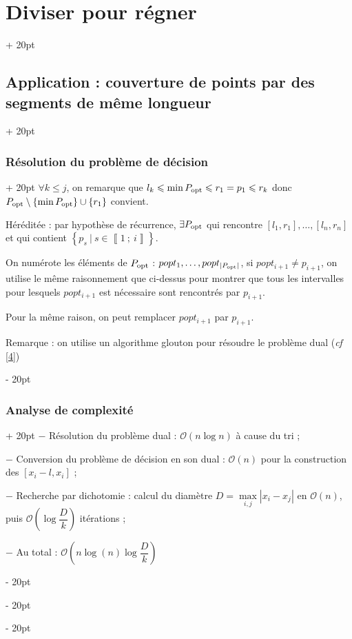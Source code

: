 \documentclass[a4paper, 12pt, twoside]{article}
\newcommand{\nset}[2]{\left\llbracket #1\ ;\ #2 \right\rrbracket}
\newcommand{\lr}[1]{\left( #1 \right)}
\newcommand{\set}[1]{\left\{ #1 \right\}}
\newcommand{\abs}[1]{\left\lvert #1 \right\rvert} %
\renewcommand{\le}{\leqslant}
\newcommand{\ind}[1][20pt]{\advance\leftskip + #1}
\newcommand{\deind}[1][20pt]{\advance\leftskip - #1}
\newenvironment{indt}[2][20pt]{#2 \par \ind[#1]}{\par \deind} %
\begin{document}
\begin{indt}{\section{Diviser pour régner}}
\begin{indt}{\subsection{Application : couverture de points par des segments de même longueur}}
\begin{indt}{\subsubsection{Résolution du problème de décision}}
                $\forall k \le j$, on remarque que $l_k \le \min P_{\rm opt} \le r_1 = p_1 \le r_k$ donc $P_{\rm opt} \setminus \set{\min P_{\rm opt}} \cup \set{r_1}$ convient.
                
                \vspace{6pt}
                
                Héréditée : par hypothèse de récurrence, $\exists P_{\rm opt}$ qui rencontre $[l_1, r_1], \ldots, [l_n, r_n]$ et qui contient $\set{p_s\ |\ s \in \nset 1 i}$.
                
                On numérote les éléments de $P_{\rm opt}$ : $popt_1, \ldots, popt_{\abs{P_{\rm opt}}}$, si $popt_{i + 1} \neq p_{i + 1}$, on utilise le même raisonnement que ci-dessus pour montrer que tous les intervalles pour lesquels $popt_{i + 1}$ est nécessaire sont rencontrés par $p_{i + 1}$.
                
                Pour la même raison, on peut remplacer $popt_{i + 1}$ par $p_{i + 1}$.
                
                \vspace{12pt}
                
                Remarque : on utilise un algorithme glouton pour résoudre le problème dual (\textit{cf} \ref{4})
            \end{indt}
            
            \vspace{12pt}
            
            \begin{indt}{\subsubsection{Analyse de complexité}}
                $-$ Résolution du problème dual : $\mathcal O(n\log n)$ à cause du tri ;
                
                $-$ Conversion du problème de décision en son dual : $\mathcal O(n)$ pour la construction des $[x_i - l, x_i]$ ;
                
                $-$ Recherche par dichotomie : calcul du diamètre $D = \max\limits_{i, j}\abs{x_i - x_j}$ en $\mathcal O(n)$, puis $\mathcal O\lr{\log \dfrac D k}$ itérations ;
                
                $-$ Au total : $\mathcal O\lr{n\log(n) \log \dfrac D k}$
            \end{indt}
        \end{indt}
        
    \end{indt}
    
\end{document}

